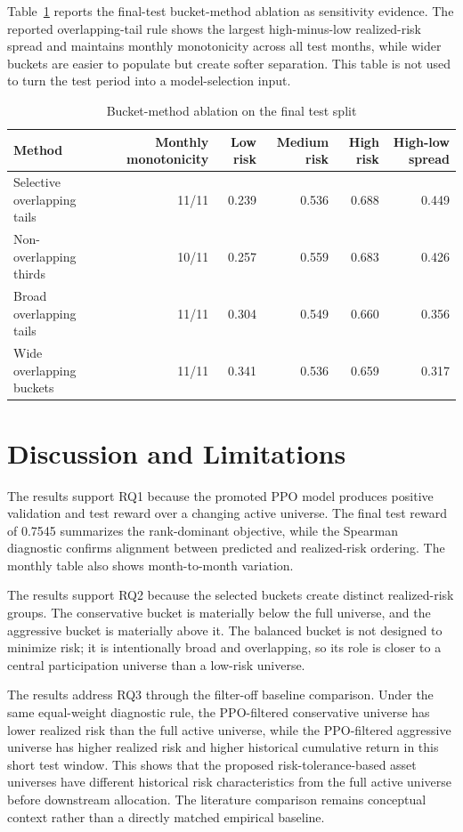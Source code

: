 Table~\ref{tab:bucket_method_ablation} reports the final-test bucket-method ablation as sensitivity evidence. The reported overlapping-tail rule shows the largest high-minus-low realized-risk spread and maintains monthly monotonicity across all test months, while wider buckets are easier to populate but create softer separation. This table is not used to turn the test period into a model-selection input.

\begin{table}[H]
\centering
\scriptsize
\caption{Bucket-method ablation on the final test split}
\label{tab:bucket_method_ablation}
\begin{tabular}{lrrrrr}
\toprule
Method & Monthly monotonicity & Low risk & Medium risk & High risk & High-low spread \\
\midrule
Selective overlapping tails & 11/11 & 0.239 & 0.536 & 0.688 & 0.449 \\
Non-overlapping thirds & 10/11 & 0.257 & 0.559 & 0.683 & 0.426 \\
Broad overlapping tails & 11/11 & 0.304 & 0.549 & 0.660 & 0.356 \\
Wide overlapping buckets & 11/11 & 0.341 & 0.536 & 0.659 & 0.317 \\
\bottomrule
\end{tabular}
\end{table}

\section{Discussion and Limitations}
\label{sec:results_discussion}

The results support RQ1 because the promoted PPO model produces positive validation and test reward over a changing active universe. The final test reward of 0.7545 summarizes the rank-dominant objective, while the Spearman diagnostic confirms alignment between predicted and realized-risk ordering. The monthly table also shows month-to-month variation.

The results support RQ2 because the selected buckets create distinct realized-risk groups. The conservative bucket is materially below the full universe, and the aggressive bucket is materially above it. The balanced bucket is not designed to minimize risk; it is intentionally broad and overlapping, so its role is closer to a central participation universe than a low-risk universe.

The results address RQ3 through the filter-off baseline comparison. Under the same equal-weight diagnostic rule, the PPO-filtered conservative universe has lower realized risk than the full active universe, while the PPO-filtered aggressive universe has higher realized risk and higher historical cumulative return in this short test window. This shows that the proposed risk-tolerance-based asset universes have different historical risk characteristics from the full active universe before downstream allocation. The literature comparison remains conceptual context rather than a directly matched empirical baseline.

